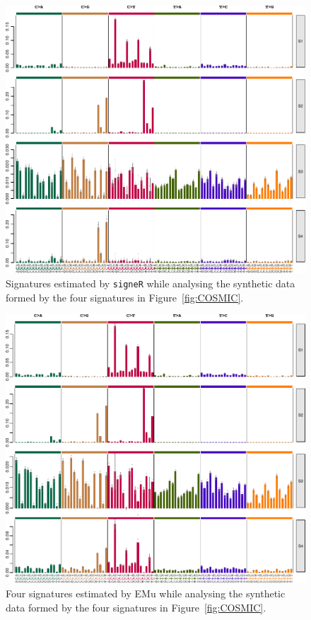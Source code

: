 \documentclass[11pt]{amsart}
\theoremstyle{definition}
\begin{document}
\begin{center}
\begin{figure}
\includegraphics[width=16cm]{sfigs/Signatures_plot_simulated_21bc_com_Opp}
\caption{Signatures estimated by \texttt{signeR} while analysing the
  synthetic data  formed by the four signatures in
  Figure~\ref{fig:COSMIC}.}\label{fig:signeR} 
\end{figure}
\end{center}

\begin{center}
\begin{figure}
  \includegraphics[width=16cm]{sfigs/Signature_EMu_plot}
  \caption{Four signatures estimated by EMu while
  analysing the synthetic data  formed by the four signatures in
  Figure~\ref{fig:COSMIC}.}\label{fig:EMu}
\end{figure}
\end{center}
\end{document}
